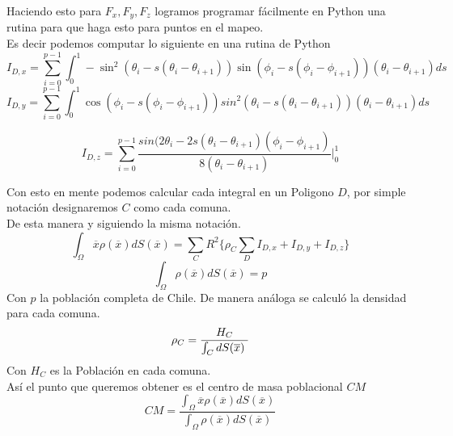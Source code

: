 \documentclass[20pt]{report}
\begin{document}
\begin{itemize}
Haciendo esto para $F_x,F_y,F_z$ logramos programar f\'acilmente en Python una rutina para que haga esto para puntos en el mapeo.
\\
Es decir podemos computar lo siguiente en una rutina de Python
\begin{equation}
I_{D,x}= \sum_{i=0}^{p-1}\int_{0}^1 -\sin^2(\theta_i - s(\theta_i - \theta_{i+1})) \sin(\phi_i - s(\phi_i - \phi_{i+1}))(\theta_i - \theta_{i+1}) ds
\end{equation}
\begin{equation}
I_{D,y}= \sum_{i=0}^{p-1}\int_{0}^1 \cos(\phi_i - s(\phi_i - \phi_{i+1}))sin^2(\theta_i - s(\theta_i - \theta_{i+1}))(\theta_i - \theta_{i+1}) ds
\end{equation}

\begin{equation}
I_{D,z}= \sum_{i=0}^{p-1} \dfrac{sin(2\theta_i - 2s(\theta_i - \theta_{i+1})(\phi_i - \phi_{i+1})}{8(\theta_i - \theta_{i+1})}|_{0}^1
\end{equation}


Con esto en mente podemos calcular cada integral en un Poligono $D$, por simple notaci\'on designaremos $C$ como cada comuna.
\\
De esta manera y siguiendo la misma notaci\'on.
\begin{equation}
\int_{\Omega} \overline{x}\rho(\overline{x}) dS(\overline{x})=\sum_{C} R^2  \lbrace \rho_{C} \sum_{D} I_{D,x} + I_{D,y}+ I_{D,z} \rbrace 
\end{equation}
\begin{equation}
\int_{\Omega} \rho(\overline{x}) dS(\overline{x})=p
\end{equation}
Con $p$ la población completa de Chile.
De manera an\'aloga se calcul\'o la densidad para cada  comuna. 
\begin{equation}
\rho_{C}= \dfrac{H_C}{ \int_{C} dS(\overline{x}) \hspace{0.1cm} }  
\end{equation}
Con $H_C$ es la Población en cada comuna.\\

As\'i el punto que queremos obtener es el centro de masa poblacional $CM$
$${CM}=\dfrac{\int_{\Omega} \overline{x}\rho(\overline{x}) dS(\overline{x})}{\int_{\Omega} \rho(\overline{x}) dS(\overline{x})}$$
\pagebreak


\end{itemize}
\end{document}
